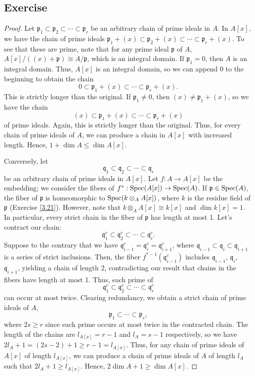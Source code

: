 \subsection{Exercise}\label{11.6}

\begin{proof}
Let $\mathfrak{p}_1 \subset \mathfrak{p}_2 \subset \cdots \subset \mathfrak{p}_r$ be an arbitrary chain of prime ideals in $A$. In $A[x]$, we have the chain of
prime ideals $\mathfrak{p}_1 + (x) \subset \mathfrak{p}_2 + (x) \subset \cdots \subset \mathfrak{p}_r + (x)$. To see that these are prime, note that for any
prime ideal $\mathfrak{p}$ of $A$, $A[x]/((x) + \mathfrak{p}) \cong A/\mathfrak{p}$, which is an integral domain. If $\mathfrak{p}_1 = 0$, then $A$ is an integral 
domain. Thus, $A[x]$ is an integral domain, so we can append $0$ to the beginning to obtain the chain
$$0 \subset \mathfrak{p}_1 + (x) \subset \cdots \subset \mathfrak{p}_r + (x).$$
This is strictly longer than the original. If $\mathfrak{p}_1 \neq 0$, then $(x) \neq \mathfrak{p}_1 + (x)$, so we have the chain
$$(x) \subset \mathfrak{p}_1 + (x) \subset \cdots \subset \mathfrak{p}_r + (x)$$
of prime ideals. Again, this is strictly longer than the original. Thus, for every chain of prime ideals of $A$, we can produce a chain in $A[x]$ with increased length.
Hence, $1 + \dim A \le \dim A[x]$.

Conversely, let
$$\mathfrak{q}_1 \subset \mathfrak{q}_2 \subset \cdots \subset \mathfrak{q}_r$$
be an arbitrary chain of prime ideals in $A[x]$. Let $f : A \to A[x]$ be the embedding; we consider the fibers of $f^* : \operatorname{Spec}(A[x]) \to \operatorname{Spec}(A)$. If $\mathfrak{p} \in \operatorname{Spec}(A)$, 
the fiber of $\mathfrak{p}$ is homeomorphic to $\operatorname{Spec}(k \otimes_A A[x])$, where $k$ is the residue field of $\mathfrak{p}$ (Exercise \ref{3.21}). However, note 
that $k \otimes_A A[x] \cong k[x]$ and $\dim k[x] = 1$. In particular, every strict chain in the fiber of $\mathfrak{p}$ has length at most 1. Let's contract our chain:
$$\mathfrak{q}_1^c \subset \mathfrak{q}_2^c \subset \cdots \subset \mathfrak{q}_r^c.$$
Suppose to the contrary that we have $\mathfrak{q}_{i-1}^c = \mathfrak{q}_i^c = \mathfrak{q}_{i+1}^c$, where $\mathfrak{q}_{i-1} \subset \mathfrak{q}_i \subset \mathfrak{q}_{i+1}$
is a series of strict inclusions. Then, the fiber $f^{*-1}(\mathfrak{q}_{i-1}^c)$ includes $\mathfrak{q}_{i-1}$, $\mathfrak{q}_i$, $\mathfrak{q}_{i+1}$, yielding a chain of length
2, contradicting our result that chains in the fibers have length at most 1. Thus, each prime of
$$\mathfrak{q}_1^c \subset \mathfrak{q}_2^c \subset \cdots \subset \mathfrak{q}_r^c$$
can occur at most twice. Clearing redundancy, we obtain a strict chain of prime ideals of $A$,
$$\mathfrak{p}_1 \subset \cdots \subset \mathfrak{p}_s,$$
where $2s \ge r$ since each prime occurs at most twice in the contracted chain. The length of the chains are $l_{A[x]} = r - 1$ and $l_A = s - 1$ respectively, so we have
$2 l_A + 1 = (2s - 2) + 1 \ge r - 1 = l_{A[x]}$. Thus, for any chain of prime ideals of $A[x]$ of length $l_{A[x]}$, we can produce a chain of prime ideals of $A$
of length $l_A$ such that $2 l_A + 1 \ge l_{A[x]}$. Hence, $2 \dim A + 1 \ge \dim A[x]$.


\end{proof}
